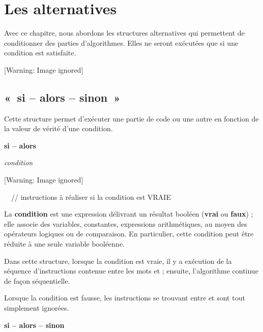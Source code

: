 \chapter[Les alternatives]{
Les alternatives}
{
Avec ce chapitre, nous abordons les structures alternatives qui
permettent de conditionner des parties d'algorithmes.
Elles ne seront exécutées que si une condition est satisfaite. }

\begin{center}
 [Warning: Image ignored] %

\end{center}
\section{«~si – alors – sinon~»}
{
Cette structure permet d'exécuter une partie de code ou
une autre en fonction de la valeur de vérité d'une
condition.}

{\sffamily\bfseries\upshape
si – alors}

{\sffamily
{} \textit{condition} }

\begin{center}
 [Warning: Image ignored] %

\end{center}
{\sffamily
\ \ // instructions à réaliser si la condition est VRAIE}

{\sffamily
{}}

{
La \textbf{condition} est une expression délivrant un résultat booléen
(\textbf{vrai} ou \textbf{faux}) ; elle associe des variables,
constantes, expressions arithmétiques, au moyen des opérateurs logiques
ou de comparaison. En particulier, cette condition peut être réduite à
une seule variable booléenne.}

{
Dans cette structure, lorsque la condition est vraie, il y a exécution
de la séquence d’instructions contenue entre les mots
 et  ; ensuite,
l’algorithme continue de façon séquentielle.}

{
Lorsque la condition est fausse, les instructions se trouvant entre
 et  sont tout simplement
ignorées.}

{\sffamily\bfseries
si – alors – sinon}


